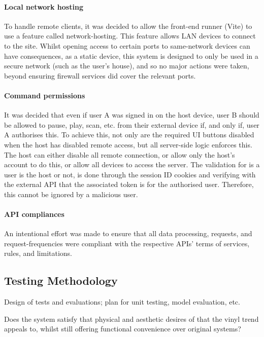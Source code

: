             \paragraph{Local network hosting} To handle remote clients, it was decided to allow the front-end runner (Vite) to use a feature called network-hosting. This feature allows LAN devices to connect to the site. Whilst opening access to certain ports to same-network devices can have consequences, as a static device, this system is designed to only be used in a secure network (such as the user's house), and so no major actions were taken, beyond ensuring firewall services did cover the relevant ports.
    
            \paragraph{Command permissions} It was decided that even if user A was signed in on the host device, user B should be allowed to pause, play, scan, etc. from their external device if, and only if, user A authorises this. To achieve this, not only are the required UI buttons disabled when the host has disabled remote access, but all server-side logic enforces this. The host can either disable all remote connection, or allow only the host's account to do this, or allow all devices to access the server. The validation for is a user is the host or not, is done through the session ID cookies and verifying with the external API that the associated token is for the authorised user. Therefore, this cannot be ignored by a malicious user.
    
            \paragraph{API compliances} An intentional effort was made to ensure that all data processing, requests, and request-frequencies were compliant with the respective APIs' terms of services, rules, and limitations.
        
        \subsection{Testing Methodology}
    
            \begin{temp}
                Design of tests and evaluations; plan for unit testing, model evaluation, etc.
                
                Does the system satisfy that physical and aesthetic desires of that the vinyl trend appeals to, whilst still offering functional convenience over original systems?
            \end{temp}
            
